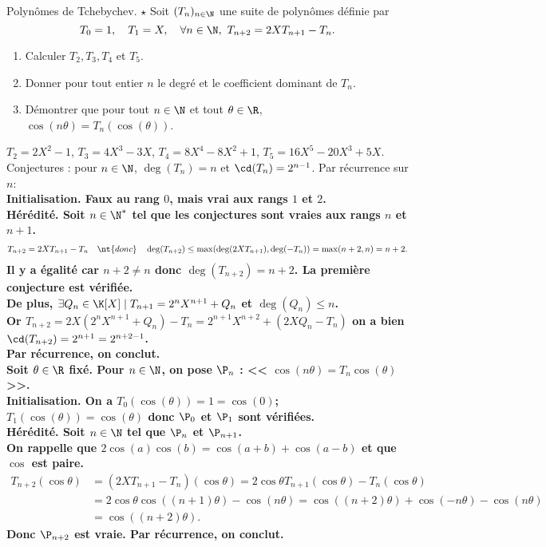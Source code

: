 \documentclass[11pt]{article}
\begin{document}
\begin{ex}{Polynômes de Tchebychev. $\star$}{}
    Soit $(T_n)_{n\in\N}$ une suite de polynômes définie par
    \begin{equation*}
        T_0=1, \quad T_1=X, \quad \forall n\in\N, ~ T_{n+2}=2XT_{n+1}-T_n.
    \end{equation*}
    \begin{enumerate}
        \item Calculer $T_2,T_3,T_4$ et $T_5$.
        \item Donner pour tout entier $n$ le degré et le coefficient dominant de $T_n$.
        \item Démontrer que pour tout $n\in\N$ et tout $\theta\in\R$, $\cos(n\theta)=T_n(\cos(\theta))$.
    \end{enumerate}
    \tcblower
     $T_2=2X^2-1$, $T_3=4X^3-3X$, $T_4=8X^4-8X^2+1$, $T_5=16X^5-20X^3+5X$.\\
     Conjectures : pour $n\in\N$, $\deg(T_n)=n$ et $\cd(T_n)=2^{n-1}$. Par récurrence sur $n$:\\
    \bf{Initialisation.} Faux au rang $0$, mais vrai aux rangs $1$ et $2$.\\
    \bf{Hérédité.} Soit $n\in\N^*$ tel que les conjectures sont vraies aux rangs $n$ et $n+1$.
    \begin{align*}
        T_{n+2} = 2XT_{n+1}-T_n \quad \nt{donc} \quad \deg(T_{n+2})\leq\max(\deg(2XT_{n+1}), \deg(-T_n))=\max(n+2,n)=n+2.
    \end{align*}
    Il y a égalité car $n+2\neq n$ donc $\deg(T_{n+2})=n+2$. La première conjecture est vérifiée.\\
    De plus, $\exists Q_n \in \K[X] \mid T_{n+1}=2^nX^{n+1}+Q_n$ et $\deg(Q_n)\leq n$.\\
    Or $T_{n+2}=2X(2^nX^{n+1}+Q_n)-T_n=2^{n+1}X^{n+2}+(2XQ_n-T_n)$ on a bien $\cd(T_{n+2})=2^{n+1}=2^{n+2-1}$.\\
    Par récurrence, on conclut.\\
     Soit $\theta\in\R$ fixé. Pour $n\in\N$, on pose $\P_n$ : << $\cos(n\theta)=T_n\cos(\theta)$ >>.\\
    \bf{Initialisation.} On a $T_0(\cos(\theta))=1=\cos(0)$; ~ $T_1(\cos(\theta))=\cos(\theta)$ donc $\P_0$ et $\P_1$ sont vérifiées.\\
    \bf{Hérédité.} Soit $n\in\N$ tel que $\P_n$ et $\P_{n+1}$.\\
    On rappelle que $2\cos(a)\cos(b)=\cos(a+b)+\cos(a-b)$ et que $\cos$ est paire.
    \begin{align*}
        T_{n+2}(\cos\theta)&=(2XT_{n+1}-T_n)(\cos\theta)=2\cos\theta T_{n+1}(\cos\theta)-T_n(\cos\theta)\\
        &=2\cos\theta\cos((n+1)\theta)-\cos(n\theta)=\cos((n+2)\theta)+\cos(-n\theta)-\cos(n\theta)\\
        &=\cos((n+2)\theta).
    \end{align*}
    Donc $\P_{n+2}$ est vraie. Par récurrence, on conclut.
\end{ex}
\end{document}
